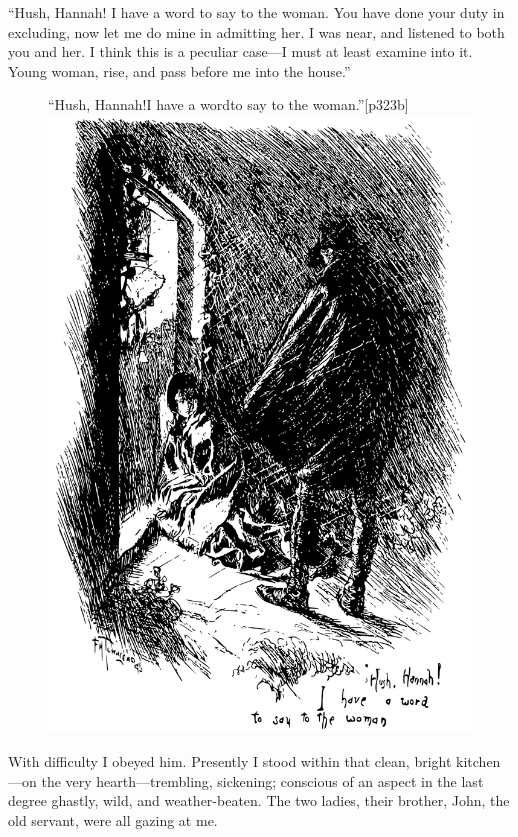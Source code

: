 \enquote{Hush, Hannah! I have a word to say to the woman. You have
	done your duty in excluding, now let me do mine in admitting her. I was
	near, and listened to both you and her. I think this is a peculiar
	case---I must at least examine into it. Young woman, rise, and pass
	before me into the house.}

\begin{figure}
	\begin{sidecaption}{\enquote{Hush, Hannah!\linebreak I have a word\linebreak to say to the woman.}}[p323b]
		\centering
		\includegraphics[width=\linewidth]{images/p323b.pdf}
	\end{sidecaption}
\end{figure}

With difficulty I obeyed him. Presently I stood within that clean,
bright kitchen---on the very hearth---trembling, sickening; conscious of
an aspect in the last degree ghastly, wild, and weather-beaten. The two
ladies, their brother, \Mr{} \St{} John, the old servant, were all gazing at
me.

